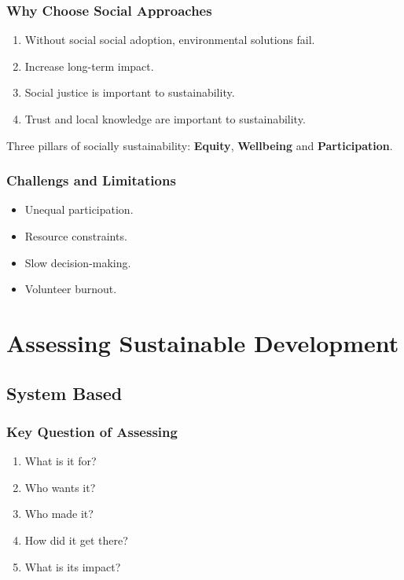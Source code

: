 \documentclass{NoteThesis/note-thesis}
\begin{document}
\subsubsection*{Why Choose Social Approaches}

\begin{enumerate}
    \item Without social social adoption, environmental solutions fail.
    \item Increase long-term impact.
    \item Social justice is important to sustainability.
    \item Trust and local knowledge are important to sustainability.
\end{enumerate}

Three pillars of socially sustainability: \textbf{Equity}, \textbf{Wellbeing} and \textbf{Participation}.

\subsubsection*{Challengs and Limitations}

\begin{itemize}
    \item Unequal participation.
    \item Resource constraints.
    \item Slow decision-making.
    \item Volunteer burnout.
\end{itemize}

\section{Assessing Sustainable Development}

\subsection{System Based}

\subsubsection*{Key Question of Assessing}

\begin{enumerate}
    \item What is it for?
    \item Who wants it?
    \item Who made it?
    \item How did it get there?
    \item What is its impact?
\end{enumerate}
\end{document}

